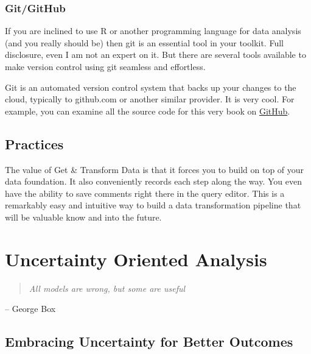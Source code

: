 \documentclass[]{book}
\begin{document}
\hypertarget{gitgithub}{%
\subsection{Git/GitHub}\label{gitgithub}}

If you are inclined to use R or another programming language for data analysis (and you really should be) then git is an essential tool in your toolkit. Full disclosure, even I am not an expert on it. But there are several tools available to make version control using git seamless and effortless.

Git is an automated version control system that backs up your changes to the cloud, typically to github.com or another similar provider. It is very cool. For example, you can examine all the source code for this very book on \href{https://github.com/nemethc/dataisfordemocracy/tree/master/doingdemocraticdataanalysis}{GitHub}.

\hypertarget{practices-1}{%
\section{Practices}\label{practices-1}}

The value of Get \& Transform Data is that it forces you to build on top of your data foundation. It also conveniently records each step along the way. You even have the ability to save comments right there in the query editor. This is a remarkably easy and intuitive way to build a data transformation pipeline that will be valuable know and into the future.

\hypertarget{uncertainty-oriented-analysis}{%
\chapter{Uncertainty Oriented Analysis}\label{uncertainty-oriented-analysis}}

\begin{quote}
\emph{All models are wrong, but some are useful}
\end{quote}

-- George Box

\hypertarget{embracing-uncertainty-for-better-outcomes}{%
\section{Embracing Uncertainty for Better Outcomes}\label{embracing-uncertainty-for-better-outcomes}}
\end{document}
